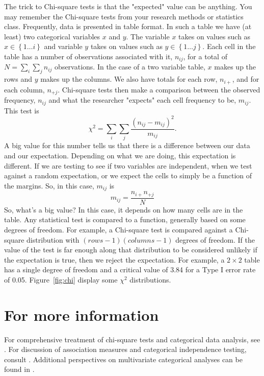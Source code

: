The trick to Chi-square tests is that the "expected" value can be anything. You may remember the Chi-square tests from your research methods or statistics class. Frequently, data is presented in table format. In such a table we have (at least) two categorical variables $x$ and $y$. The variable $x$ takes on values such as $x\in\left\{1 \ldots i\right\}$ and variable $y$ takes on values such as $y\in\left\{1 \ldots j\right\}$. Each cell in the table has a number of observations associated with it, $n_{ij}$, for a total of $N=\sum_i\sum_jn_{ij}$ observations. In the case of a two variable table, $x$ makes up the rows and $y$ makes up the columns. We also have totals for each row, $n_{i+}$, and for each column, $n_{+j}$. Chi-square tests then make a comparison between the observed frequency, $n_{ij}$ and what the researcher "expects" each cell frequency to be, $m_{ij}$. This test is
\begin{equation}
\chi^2=\sum_i{\sum_j{\frac{\left(n_{ij}-m_{ij}\right)^2}{m_{ij}}}}.
\end{equation}
A big value for this number tells us that there is a difference between our data and our expectation. Depending on what we are doing, this expectation is different. If we are testing to see if two variables are independent, when we test against a random expectation, or we expect the cells to simply be a function of the margins. So, in this case, $m_{ij}$ is
\begin{equation}
m_{ij}=\frac{n_{i+}n_{+j}}{N}
\end{equation}
So, what's a big value? In this case, it depends on how many cells are in the table. Any statistical test is compared to a function, generally based on some degrees of freedom. For example, a Chi-square test is compared against a Chi-square distribution with $\left(rows-1\right)\left(columns-1\right)$ degrees of freedom. If the value of the test is far enough along that distribution to be considered unlikely if the expectation is true, then we reject the expectation. For example, a $2\times2$ table has a single degree of freedom and a critical value of 3.84 for a Type I error rate of 0.05. Figure~\ref{fig:chi} display some $\chi^2$ distributions.

\section*{For more information}
For comprehensive treatment of chi-square tests and categorical data analysis, see \citep{agresti}. For discussion of association measures and categorical independence testing, consult \citep{rice2007mathematical}. Additional perspectives on multivariate categorical analyses can be found in \citep{cameron2005microeconometrics}.
